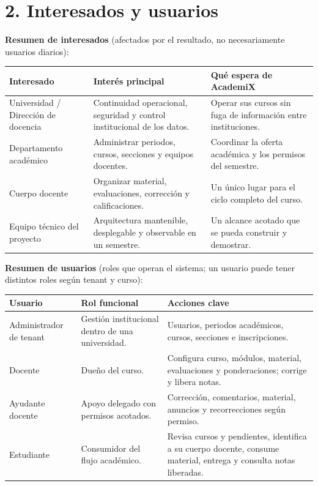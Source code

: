 \documentclass[letterpaper,10pt]{article}
\begin{document}
\section{2. Interesados y usuarios}

\textbf{Resumen de interesados} (afectados por el resultado, no necesariamente usuarios diarios):

{\small
\begin{tabularx}{\textwidth}{|p{3.15cm}|Y|Y|}
\hline
\textbf{Interesado} & \textbf{Interés principal} & \textbf{Qué espera de AcademiX} \\
\hline
Universidad / Dirección de docencia & Continuidad operacional, seguridad y control institucional de los datos. & Operar sus cursos sin fuga de información entre instituciones. \\
\hline
Departamento académico & Administrar periodos, cursos, secciones y equipos docentes. & Coordinar la oferta académica y los permisos del semestre. \\
\hline
Cuerpo docente & Organizar material, evaluaciones, corrección y calificaciones. & Un único lugar para el ciclo completo del curso. \\
\hline
Equipo técnico del proyecto & Arquitectura mantenible, desplegable y observable en un semestre. & Un alcance acotado que se pueda construir y demostrar. \\
\hline
\end{tabularx}}

\textbf{Resumen de usuarios} (roles que operan el sistema; un usuario puede tener distintos roles según tenant y curso):

{\small
\begin{tabularx}{\textwidth}{|p{3.15cm}|Y|Y|}
\hline
\textbf{Usuario} & \textbf{Rol funcional} & \textbf{Acciones clave} \\
\hline
Administrador de tenant & Gestión institucional dentro de una universidad. & Usuarios, periodos académicos, cursos, secciones e inscripciones. \\
\hline
Docente & Dueño del curso. & Configura curso, módulos, material, evaluaciones y ponderaciones; corrige y libera notas. \\
\hline
Ayudante docente & Apoyo delegado con permisos acotados. & Corrección, comentarios, material, anuncios y recorrecciones según permiso. \\
\hline
Estudiante & Consumidor del flujo académico. & Revisa cursos y pendientes, identifica a su cuerpo docente, consume material, entrega y consulta notas liberadas. \\
\hline
\end{tabularx}}
\end{document}
